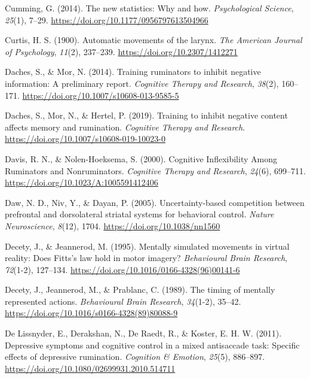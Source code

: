 \documentclass[a4paper,12pt,twoside,onecolumn,openright,final,oldfontcommands]{memoir}
\begin{document}
\leavevmode\hypertarget{ref-cumming_new_2014}{}%
Cumming, G. (2014). The new statistics: Why and how. \emph{Psychological Science}, \emph{25}(1), 7--29. \url{https://doi.org/10.1177/0956797613504966}

\leavevmode\hypertarget{ref-curtis_automatic_1900}{}%
Curtis, H. S. (1900). Automatic movements of the larynx. \emph{The American Journal of Psychology}, \emph{11}(2), 237--239. \url{https://doi.org/10.2307/1412271}

\leavevmode\hypertarget{ref-daches_training_2014}{}%
Daches, S., \& Mor, N. (2014). Training ruminators to inhibit negative information: A preliminary report. \emph{Cognitive Therapy and Research}, \emph{38}(2), 160--171. \url{https://doi.org/10.1007/s10608-013-9585-5}

\leavevmode\hypertarget{ref-daches_training_2019}{}%
Daches, S., Mor, N., \& Hertel, P. (2019). Training to inhibit negative content affects memory and rumination. \emph{Cognitive Therapy and Research}. \url{https://doi.org/10.1007/s10608-019-10023-0}

\leavevmode\hypertarget{ref-Davis2000}{}%
Davis, R. N., \& Nolen-Hoeksema, S. (2000). Cognitive Inflexibility Among Ruminators and Nonruminators. \emph{Cognitive Therapy and Research}, \emph{24}(6), 699--711. \url{https://doi.org/10.1023/A:1005591412406}

\leavevmode\hypertarget{ref-daw_uncertainty-based_2005}{}%
Daw, N. D., Niv, Y., \& Dayan, P. (2005). Uncertainty-based competition between prefrontal and dorsolateral striatal systems for behavioral control. \emph{Nature Neuroscience}, \emph{8}(12), 1704. \url{https://doi.org/10.1038/nn1560}

\leavevmode\hypertarget{ref-decety_mentally_1995}{}%
Decety, J., \& Jeannerod, M. (1995). Mentally simulated movements in virtual reality: Does Fitts's law hold in motor imagery? \emph{Behavioural Brain Research}, \emph{72}(1-2), 127--134. \url{https://doi.org/10.1016/0166-4328(96)00141-6}

\leavevmode\hypertarget{ref-decety_timing_1989}{}%
Decety, J., Jeannerod, M., \& Prablanc, C. (1989). The timing of mentally represented actions. \emph{Behavioural Brain Research}, \emph{34}(1-2), 35--42. \url{https://doi.org/10.1016/s0166-4328(89)80088-9}

\leavevmode\hypertarget{ref-DeLissnyder2011}{}%
De Lissnyder, E., Derakshan, N., De Raedt, R., \& Koster, E. H. W. (2011). Depressive symptoms and cognitive control in a mixed antisaccade task: Specific effects of depressive rumination. \emph{Cognition \& Emotion}, \emph{25}(5), 886--897. \url{https://doi.org/10.1080/02699931.2010.514711}
\end{document}
